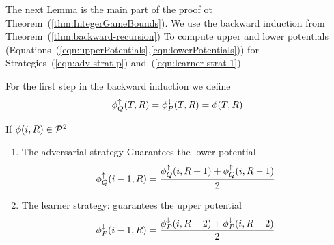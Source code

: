 \documentclass{article}[12pt]
\begin{document}
The next Lemma is the main part of the proof ot
Theorem~(\ref{thm:IntegerGameBounds}). We use the backward induction
from Theorem~(\ref{thm:backward-recursion}) To compute upper and lower
potentials (Equations~(\ref{eqn:upperPotentials},\ref{eqn:lowerPotentials})) for
Strategies~(\ref{eqn:adv-strat-p}) and~(\ref{eqn:learner-strat-1})

For the first step in the backward induction we define
$$  \phi_{Q}^{\uparrow}(T,R) = \phi_{P}^{\downarrow}(T,R) = \phi(T,R) $$

\begin{lemma} \label{lemma:first-order-bound}
  If $\phi(i,R) \in {\cal P}^{2}$
  \begin{enumerate}
    \item The adversarial strategy
    Guarantees the lower potential
 \begin{equation} \label{eqn:value-iteration-lower}
   \phi_{Q}^{\uparrow}(i-1, R) = \frac{\phi_{Q}^{\uparrow}(i,R+1) + \phi_{Q}^{\uparrow}(i,R-1)}{2}
 \end{equation}
   
    \item The learner strategy:
      guarantees the upper potential 
      \begin{equation} \label{eqn:value-iteration-upper-recursion}
        \phi_{P}^{\downarrow}(i-1, R) = \frac{\phi_{P}^{\downarrow}(i,R+2) + \phi_{P}^{\downarrow}(i,R-2)}{2}
      \end{equation}
    \end{enumerate}
    
\end{lemma}
\end{document}
